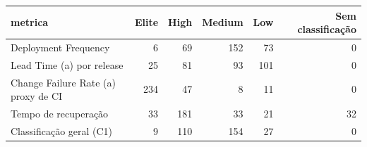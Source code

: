 \begin{tabular}{lrrrrr}
\hline
metrica & Elite & High & Medium & Low & Sem classificação \\
\hline
Deployment Frequency & 6 & 69 & 152 & 73 & 0 \\
Lead Time (a) por release & 25 & 81 & 93 & 101 & 0 \\
Change Failure Rate (a) proxy de CI & 234 & 47 & 8 & 11 & 0 \\
Tempo de recuperação & 33 & 181 & 33 & 21 & 32 \\
Classificação geral (C1) & 9 & 110 & 154 & 27 & 0 \\
\hline
\end{tabular}
